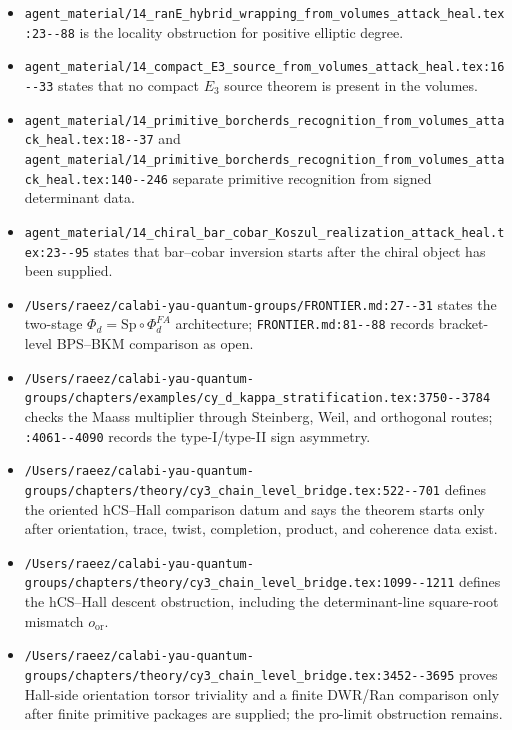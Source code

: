 \begin{itemize}
\item
\verb|agent_material/14_ranE_hybrid_wrapping_from_volumes_attack_heal.tex:23--88|
is the locality obstruction for positive elliptic degree.

\item
\verb|agent_material/14_compact_E3_source_from_volumes_attack_heal.tex:16--33|
states that no compact \(E_3\) source theorem is present in the volumes.

\item
\verb|agent_material/14_primitive_borcherds_recognition_from_volumes_attack_heal.tex:18--37|
and
\verb|agent_material/14_primitive_borcherds_recognition_from_volumes_attack_heal.tex:140--246|
separate primitive recognition from signed determinant data.

\item
\verb|agent_material/14_chiral_bar_cobar_Koszul_realization_attack_heal.tex:23--95|
states that bar--cobar inversion starts after the chiral object has been
supplied.

\item
\verb|/Users/raeez/calabi-yau-quantum-groups/FRONTIER.md:27--31|
states the two-stage \(\Phi_d=\mathrm{Sp}\circ\Phi_d^{FA}\)
architecture; \verb|FRONTIER.md:81--88| records bracket-level
BPS--BKM comparison as open.

\item
\verb|/Users/raeez/calabi-yau-quantum-groups/chapters/examples/cy_d_kappa_stratification.tex:3750--3784|
checks the Maass multiplier through Steinberg, Weil, and orthogonal
routes; \verb|:4061--4090| records the type-I/type-II sign asymmetry.

\item
\verb|/Users/raeez/calabi-yau-quantum-groups/chapters/theory/cy3_chain_level_bridge.tex:522--701|
defines the oriented hCS--Hall comparison datum and says the theorem
starts only after orientation, trace, twist, completion, product, and
coherence data exist.

\item
\verb|/Users/raeez/calabi-yau-quantum-groups/chapters/theory/cy3_chain_level_bridge.tex:1099--1211|
defines the hCS--Hall descent obstruction, including the determinant-line
square-root mismatch \(o_{\mathrm{or}}\).

\item
\verb|/Users/raeez/calabi-yau-quantum-groups/chapters/theory/cy3_chain_level_bridge.tex:3452--3695|
proves Hall-side orientation torsor triviality and a finite DWR/Ran
comparison only after finite primitive packages are supplied; the
pro-limit obstruction remains.


\end{itemize}
